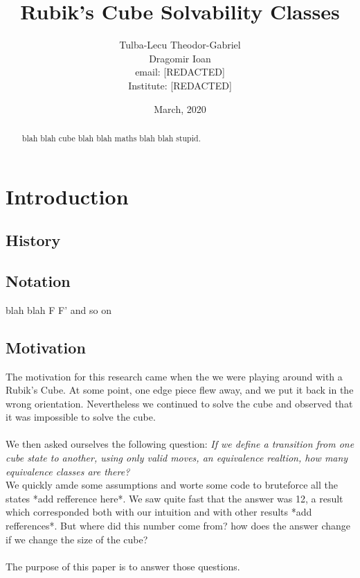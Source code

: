 \documentclass{article}
\title{Rubik's Cube Solvability Classes}
\date{March, 2020}
\author{Tulba-Lecu Theodor-Gabriel\\
    Dragomir Ioan\\
    email: [REDACTED] \\
    Institute: [REDACTED]}
\begin{document}
    
    \maketitle


    \begin{abstract}
        blah blah cube blah blah maths blah blah stupid.
    \end{abstract}

    \tableofcontents
    
    \newpage

    \section{Introduction}
    
        \subsection{History}
            
        
        \subsection{Notation}
            blah blah F F' and so on
        
        \subsection{Motivation}
            The motivation for this research came when the we were playing 
            around with a Rubik's Cube. At some point, one edge piece flew 
            away, and we put it back in the wrong orientation.
            Nevertheless we continued to solve the cube and observed that it
            was impossible to solve the cube. \\ \\
            We then asked ourselves the following question: 
            \textit{If we define a transition from one cube state to another,
            using only valid moves, an equivalence realtion, how many
            equivalence classes are there?} \\
            We quickly amde some assumptions and worte some code to bruteforce 
            all the states *add refference here*. We saw quite fast that the
            answer was 12, a result which corresponded both with our intuition 
            and with other results *add refferences*. But where did this 
            number come from? how does the answer change if we change the 
            size of the cube? \\ \\ 
            The purpose of this paper is to answer those questions.
    
\end{document}
